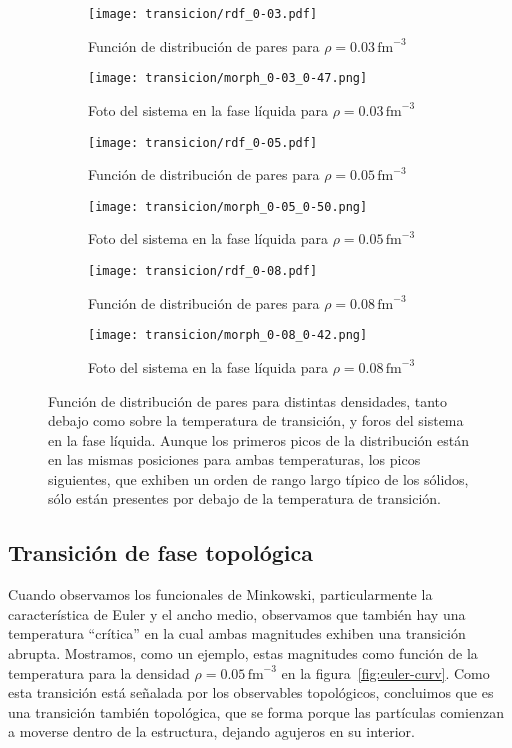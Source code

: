 \begin{figure}
  \centering
  \begin{subfigure}[h!]{0.4\columnwidth}
    \texttt{[image: transicion/rdf\_0-03.pdf]}
    \caption{Función de distribución de pares para $\rho=0.03\,\text{fm}^{-3}$}
  \end{subfigure}
  \begin{subfigure}[h!]{0.3\columnwidth}
    \texttt{[image: transicion/morph\_0-03\_0-47.png]}
    \caption{Foto del sistema en la fase líquida para $\rho=0.03\,\text{fm}^{-3}$}
  \end{subfigure}
  \begin{subfigure}[h!]{0.4\columnwidth}
    \texttt{[image: transicion/rdf\_0-05.pdf]}
    \caption{Función de distribución de pares para $\rho=0.05\,\text{fm}^{-3}$}
  \end{subfigure}
  \begin{subfigure}[h!]{0.3\columnwidth}
    \texttt{[image: transicion/morph\_0-05\_0-50.png]}
    \caption{Foto del sistema en la fase líquida para $\rho=0.05\,\text{fm}^{-3}$}
  \end{subfigure}
  \begin{subfigure}[h!]{0.4\columnwidth}
    \texttt{[image: transicion/rdf\_0-08.pdf]}
    \caption{Función de distribución de pares para $\rho=0.08\,\text{fm}^{-3}$}
  \end{subfigure}
  \begin{subfigure}[h!]{0.3\columnwidth}
    \texttt{[image: transicion/morph\_0-08\_0-42.png]}
    \caption{Foto del sistema en la fase líquida para $\rho=0.08\,\text{fm}^{-3}$}
  \end{subfigure}
  \caption{Función de distribución de pares para distintas densidades, tanto debajo como sobre la temperatura de transición, y foros del sistema en la fase líquida.
Aunque los primeros picos de la distribución están en las mismas posiciones para ambas temperaturas, los picos siguientes, que exhiben un orden de rango largo típico de los sólidos, sólo están presentes por debajo de la temperatura de transición.}
  \label{fig:rdf}
\end{figure}

\subsection{Transición de fase topológica}
Cuando observamos los funcionales de Minkowski, particularmente la característica de Euler y el ancho medio, observamos que también hay una temperatura ``crítica'' en la cual ambas magnitudes exhiben una transición abrupta.
Mostramos, como un ejemplo, estas magnitudes como función de la temperatura para la densidad
$\rho=0.05\,\text{fm}^{-3}$ en la figura~\ref{fig:euler-curv}.
Como esta transición está señalada por los observables topológicos, concluimos que es una transición también topológica, que se forma porque las partículas comienzan a moverse dentro de la estructura, dejando agujeros en su interior.

